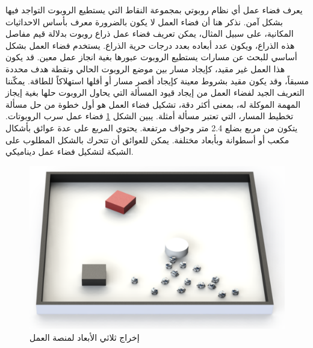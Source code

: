 يعرف فضاء عمل أي نظام روبوتي بمجموعة النقاط التي يستطيع الروبوت التواجد فيها بشكل آمن. نذكر هنا أن فضاء العمل لا يكون بالضرورة معرف بأساس الاحداثيات المكانية، على سبيل المثال، يمكن تعريف فضاء عمل ذراع روبوت بدلالة قيم مفاصل هذه الذراع، ويكون عدد أبعاده بعدد درجات حرية الذراع. يستخدم فضاء العمل بشكل أساسي للبحث عن مسارات يستطيع الروبوت عبورها بغية انجاز عمل معين. قد يكون هذا العمل غير مقيد، كإيجاد مسار بين موضع الروبوت الحالي ونقطة هدف محددة مسبقاً، وقد يكون مقيد بشروط معينة كإيجاد أقصر مسار أو أقلها استهلاكاً للطاقة. يمكّننا التعريف الجيد لفضاء العمل من إيجاد قيود المسألة التي يحاول الروبوت حلها بغية إيجاز المهمة الموكلة له، بمعنى أكثر دقة، تشكيل فضاء العمل هو أول خطوة من حل مسألة تخطيط المسار، التي تعتبر مسألة أمثلة.
يبين الشكل \ref{15:fig:4} فضاء عمل سرب الروبوتات. يتكون من مربع بضلع 2.4 متر وحواف مرتفعة. يحتوي المربع على عدة عوائق بأشكال مكعب أو أسطوانة وبأبعاد مختلفة. يمكن للعوائق أن تتحرك بالشكل المطلوب على الشبكة لتشكيل فضاء عمل ديناميكي.
 
 \begin{figure}[h]
 	\centering
 	\includegraphics[width=0.8\linewidth]{figs/15/fig4}
 	\caption{ إخراج ثلاثي الأبعاد لمنصة العمل}
 	\label{15:fig:4}
 \end{figure}
